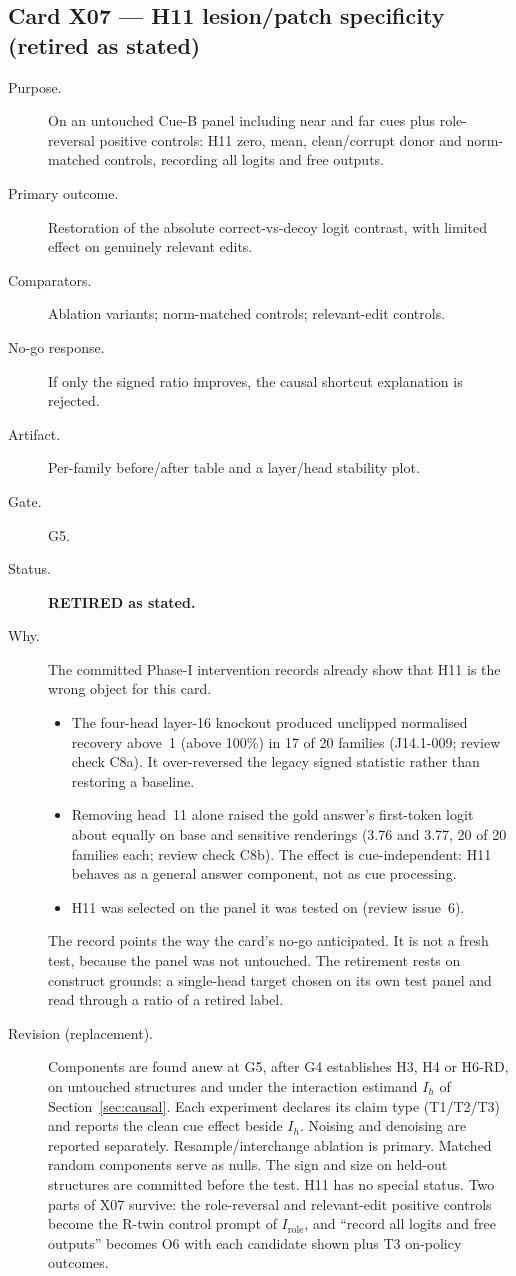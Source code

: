 \documentclass[10pt,a4paper]{article}
\begin{document}
\subsection{Card X07 --- H11 lesion/patch specificity (retired as stated)}
\label{card:X07}
\begin{description}
\item[Purpose.] On an untouched Cue-B panel including near and far cues plus role-reversal positive controls:
H11 zero, mean, clean/corrupt donor and norm-matched controls, recording all logits and free outputs.
\item[Primary outcome.] Restoration of the absolute correct-vs-decoy logit contrast, with limited effect on
genuinely relevant edits.
\item[Comparators.] Ablation variants; norm-matched controls; relevant-edit controls.
\item[No-go response.] If only the signed ratio improves, the causal shortcut explanation is rejected.
\item[Artifact.] Per-family before/after table and a layer/head stability plot.
\item[Gate.] G5.
\item[Status.] \textbf{RETIRED as stated.}
\item[Why.] The committed Phase-I intervention records already show that H11 is the wrong object for this card.
\begin{itemize}
\item The four-head layer-16 knockout produced unclipped normalised recovery above~1 (above 100\%) in 17 of 20
families (J14.1-009; review check C8a). It over-reversed the legacy signed statistic rather than restoring a
baseline.
\item Removing head~11 alone raised the gold answer's first-token logit about equally on base and sensitive
renderings (3.76 and 3.77, 20 of 20 families each; review check C8b). The effect is cue-independent: H11 behaves
as a general answer component, not as cue processing.
\item H11 was selected on the panel it was tested on (review issue~6).
\end{itemize}
The record points the way the card's no-go anticipated. It is not a fresh test, because the panel was not
untouched. The retirement rests on construct grounds: a single-head target chosen on its own test panel and read
through a ratio of a retired label.
\item[Revision (replacement).] Components are found anew at G5, after G4 establishes H3, H4 or H6-RD, on untouched
structures and under the interaction estimand $I_h$ of Section~\ref{sec:causal}. Each experiment declares its
claim type (T1/T2/T3) and reports the clean cue effect beside $I_h$. Noising and denoising are reported
separately. Resample/interchange ablation is primary. Matched random components serve as nulls. The sign and size
on held-out structures are committed before the test. H11 has no special status. Two parts of X07 survive: the
role-reversal and relevant-edit positive controls become the R-twin control prompt of $I_{\text{role}}$, and ``record all
logits and free outputs'' becomes O6 with each candidate shown plus T3 on-policy outcomes.
\end{description}
\end{document}
